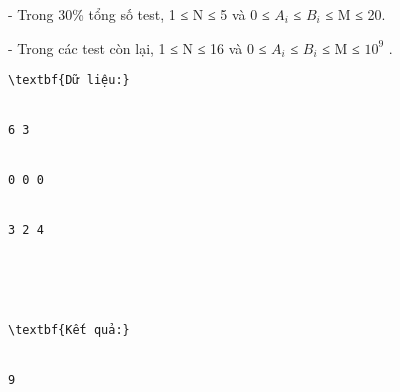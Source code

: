 - Trong 30\% tổng số test, 1 ≤ N ≤ 5 và 0 ≤ $A_{i}$   ≤ $B_{i}$   ≤ M ≤ 20.  

   - Trong các test còn lại, 1 ≤ N ≤ 16 và 0 ≤ $A_{i}$   ≤ $B_{i}$   ≤ M ≤ $10^{9}$   .
\begin{verbatim}
\textbf{Dữ liệu:}


6 3


0 0 0


3 2 4





\textbf{Kết quả:}


9\end{verbatim}